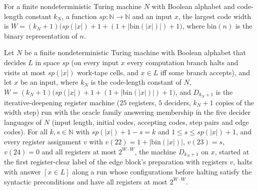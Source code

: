 \begin{definition}
\label{Complexity.LogProg.SavitchARM.dpW}
\leanok
{}
For a finite nondeterministic Turing machine $N$ with Boolean alphabet and code-length constant
$k_N$, a function $\mathit{sp}:\mathbb{N}\to\mathbb{N}$ and an input $x$, the largest code width is
$W=(k_N+1)\bigl(\mathit{sp}(|x|)+1+(1+|\mathrm{bin}(|x|)|)+1\bigr)$, where $\mathrm{bin}(n)$ is the
binary representation of $n$.
\end{definition}

\begin{theorem}
\label{Complexity.LogProg.SavitchARM.dp_body}
\leanok
{}
Let $N$ be a finite nondeterministic Turing machine with Boolean alphabet that decides $L$ in space $\mathit{sp}$ (on every input $x$ every computation branch halts and visits at most $\mathit{sp}(|x|)$ work-tape cells, and $x\in L$ iff some branch accepts), and let
$x$ be an input, where $k_N$ is the code-length constant of $N$, $W=(k_N+1)\bigl(\mathit{sp}(|x|)+1+(1+|\mathrm{bin}(|x|)|)+1\bigr)$, and $D_{k_N+1}$ is the iterative-deepening register machine ($25$ registers, $5$ deciders, $k_N+1$ copies of the width step) run with the oracle family answering membership in the five decider languages of $N$ (input length, initial codes, accepting codes, step pairs and edge codes). For all $k,s\in\mathbb{N}$ with $\mathit{sp}(|x|)+1-s=k$ and
$1\le s\le\mathit{sp}(|x|)+1$, and every register assignment $v$ with
$v(22)=1+|\mathrm{bin}(|x|)|$, $v(23)=s$, $v(24)=0$ and all registers at most $2^{W\cdot W}$,
the machine $D_{k_N+1}$ on $x$, started at the first register-clear label of the edge block's
preparation with registers $v$, halts with answer $[x\in L]$ along a run whose configurations
before halting satisfy the syntactic preconditions and have all registers at most $2^{W\cdot W}$.
\end{theorem}

